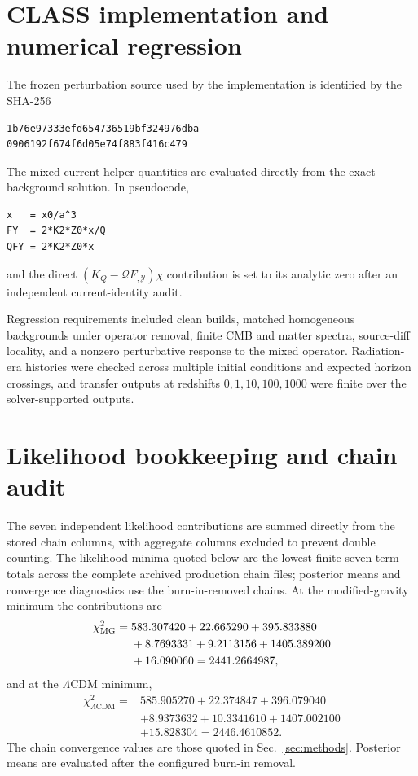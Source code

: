 \documentclass[aps,prd,twocolumn,superscriptaddress,nofootinbib,longbibliography,floatfix]{revtex4-2}
\newcommand{\LCDM}{\Lambda\mathrm{CDM}}
\newcommand{\Y}{\mathcal{Y}}
\newcommand{\Q}{\mathcal{Q}}
\begin{document}
\section{CLASS implementation and numerical regression}\label{app:class}
The frozen perturbation source used by the implementation is identified by the SHA-256
\begin{verbatim}
1b76e97333efd654736519bf324976dba
0906192f674f6d05e74f883f416c479
\end{verbatim}
The mixed-current helper quantities are evaluated directly from the exact background solution. In pseudocode,
\begin{verbatim}
x   = x0/a^3
FY  = 2*K2*Z0*x/Q
QFY = 2*K2*Z0*x
\end{verbatim}
and the direct $(K_Q-\Q F_{,\Y})\chi$ contribution is set to its analytic zero after an independent current-identity audit.

Regression requirements included clean builds, matched homogeneous backgrounds under operator removal, finite CMB and matter spectra, source-diff locality, and a nonzero perturbative response to the mixed operator. Radiation-era histories were checked across multiple initial conditions and expected horizon crossings, and transfer outputs at redshifts $0,1,10,100,1000$ were finite over the solver-supported outputs.

\section{Likelihood bookkeeping and chain audit}\label{app:likelihood}
The seven independent likelihood contributions are summed directly from the stored chain columns, with aggregate columns excluded to prevent double counting. The likelihood minima quoted below are the lowest finite seven-term totals across the complete archived production chain files; posterior means and convergence diagnostics use the burn-in-removed chains. At the modified-gravity minimum the contributions are
\begin{align}
\chi^2_{\rm MG}={}&583.307420+22.665290+395.833880\nonumber\\
&+8.7693331+9.2113156+1405.389200\nonumber\\
&+16.090060=2441.2664987,
\end{align}
and at the $\LCDM$ minimum,
\begin{align}
\chi^2_{\LCDM}={}&585.905270+22.374847+396.079040\nonumber\\
&+8.9373632+10.3341610+1407.002100\nonumber\\
&+15.828304=2446.4610852.
\end{align}
The chain convergence values are those quoted in Sec.~\ref{sec:methods}. Posterior means are evaluated after the configured burn-in removal.
\end{document}
